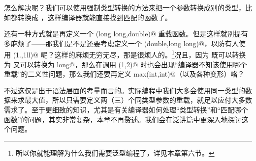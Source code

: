 怎么解决呢？我们可以使用强制类型转换的方法来把一个参数转换成别的类型，比如都转换成 \lstinline@double@，这样编译器就能直接找到匹配的函数了。\par
还有一种方式就是再定义一个 \lstinline@fun(long long,double)@ 重载函数。但是这样就别提有多麻烦了——那我们是不是还要考虑定义一个 \lstinline@fun(double,long long)@，以防有人使用 \lstinline@fun(1.,1ll)@ 呢？这样的麻烦无穷无尽，那是很烦人的。\footnote{所以你就能理解为什么我们需要泛型编程了，详见本章第六节。}况且，因为 \lstinline@int@ 既可以转换为 \lstinline@double@ 又可以转换为 \lstinline@long long@，那么在调用 \lstinline@max(1,2)@ 时也会出现``编译器不知该使用哪个重载''的二义性问题，那么我们还要再定义 \lstinline@int max(int,int)@（以及各种变形）咯？\par
不过这仅是出于语法层面的考量而言的。实际编程中我们大多会使用同一类型的数据来求最大值，所以只需要定义两（三）个同类型参数的重载，就足以应付大多数需求了。至于更细致的知识，尤其是有关编译器如何处理``类型转换''和``匹配哪个函数''的问题，其实非常复杂，本章不再赘述。我们会在泛讲篇中更深入地探讨这个问题。\par
